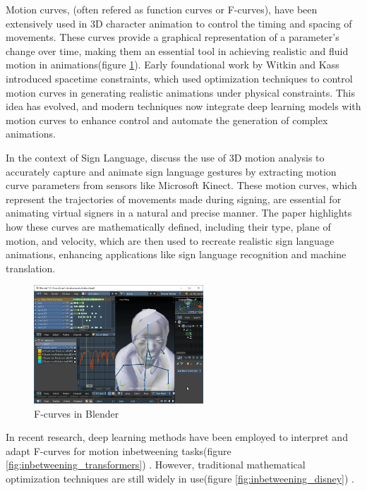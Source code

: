 \documentclass[../../main.tex]{subfiles}
\begin{document}
Motion curves, (often refered as function curves or F-curves), have been extensively used in 3D character animation to control the timing and spacing of movements. These curves provide a graphical representation of a parameter's change over time, making them an essential tool in achieving realistic and fluid motion in animations(figure \ref{fig:fcurves_blender}). Early foundational work by Witkin and Kass \cite{witkin1988spacetime} introduced spacetime constraints, which used optimization techniques to control motion curves in generating realistic animations under physical constraints. This idea has evolved, and modern techniques now integrate deep learning models with motion curves to enhance control and automate the generation of complex animations.

In the context of Sign Language, \cite{inproceedings} discuss the use of 3D motion analysis to accurately capture and animate sign language gestures by extracting motion curve parameters from sensors like Microsoft Kinect. These motion curves, which represent the trajectories of movements made during signing, are essential for animating virtual signers in a natural and precise manner. The paper highlights how these curves are mathematically defined, including their type, plane of motion, and velocity, which are then used to recreate realistic sign language animations, enhancing applications like sign language recognition and machine translation.

\begin{figure}
    \centering \includegraphics[width = 2.5in]{chapters/intermediate_blocks/images/fcurves_blender.png}
    \caption{F-curves in Blender}
    \label{fig:fcurves_blender}
\end{figure}

In recent research, deep learning methods have been employed to interpret and adapt F-curves for motion inbetweening tasks(figure \ref{fig:inbetweening_transformers}) \cite{10.1145/3550454.3555454}. However, traditional mathematical optimization techniques are still widely in use(figure \ref{fig:inbetweening_disney}) \cite{10.1145/3306346.3322938}.
\end{document}
